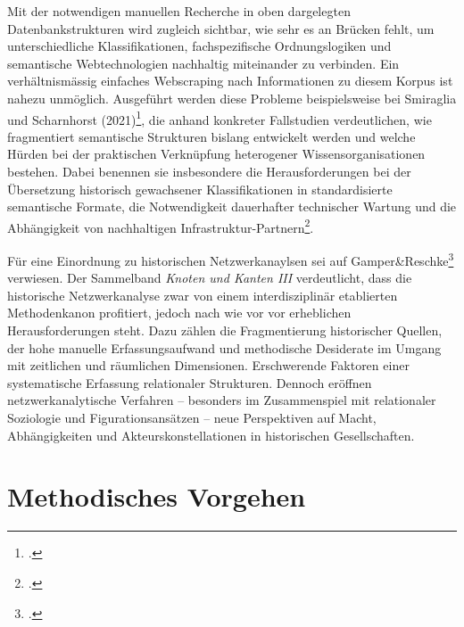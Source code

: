 \documentclass[12pt, a4paper, ngerman, bidi=default]{article}
\let\cite\footcite
\begin{document}
Mit der notwendigen manuellen Recherche in oben dargelegten Datenbankstrukturen wird zugleich sichtbar, wie sehr es an Brücken fehlt, 
um unterschiedliche Klassifikationen, fachspezifische Ordnungslogiken und semantische Webtechnologien nachhaltig miteinander zu verbinden. Ein verhältnismässig einfaches
Webscraping nach Informationen zu diesem Korpus ist nahezu unmöglich. Ausgeführt werden diese Probleme beispielsweise bei 
Smiraglia und Scharnhorst (2021)\cite[vgl.][]{richard_linking_2022}, 
 die anhand konkreter Fallstudien verdeutlichen, wie fragmentiert semantische Strukturen bislang entwickelt werden 
 und welche Hürden bei der praktischen Verknüpfung heterogener Wissensorganisationen bestehen. Dabei benennen sie insbesondere die 
 Herausforderungen bei der Übersetzung historisch gewachsener Klassifikationen in standardisierte semantische Formate, 
 die Notwendigkeit dauerhafter technischer Wartung und die Abhängigkeit von nachhaltigen Infrastruktur-Partnern\cite[vgl.][Kap. 2 und 5]{richard_linking_2022}.

Für eine Einordnung zu historischen Netzwerkanaylsen sei auf Gamper\&Reschke\cite{gamper_knoten_2015} verwiesen. Der Sammelband
\textit{Knoten und Kanten III} verdeutlicht, dass die historische Netzwerkanalyse zwar von einem interdisziplinär etablierten Methodenkanon 
profitiert, jedoch nach wie vor vor erheblichen Herausforderungen steht. Dazu zählen die Fragmentierung historischer Quellen, der hohe manuelle 
Erfassungsaufwand und methodische Desiderate im Umgang mit zeitlichen und räumlichen Dimensionen. Erschwerende Faktoren einer systematische Erfassung 
relationaler Strukturen. Dennoch eröffnen netzwerkanalytische Verfahren – besonders im Zusammenspiel mit relationaler Soziologie 
und Figurationsansätzen – neue Perspektiven auf Macht, Abhängigkeiten und Akteurskonstellationen in historischen Gesellschaften.





\section{Methodisches Vorgehen}
\end{document}
